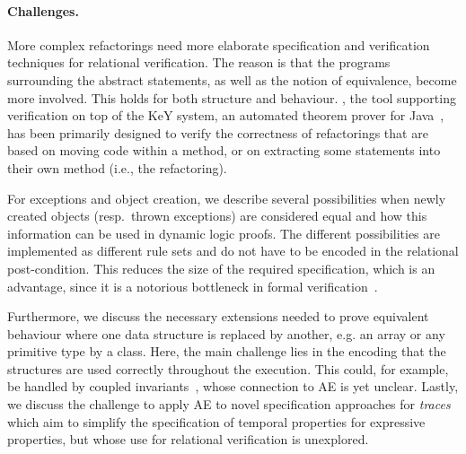 \paragraph{Challenges.}
More complex refactorings need more elaborate specification and verification techniques for relational verification. 
The reason is that the programs surrounding the abstract statements, as well as the notion of equivalence, become more involved.
This holds for both structure and behaviour.
 \Refinity{} \cite{steinhoefel:ae}, the tool supporting verification on top of the KeY system, an automated theorem prover for Java~\cite{DBLP:conf/aplas/Steinhofel20},
has been primarily designed to verify the correctness of refactorings that are based on moving code within a method, or on extracting some statements into their own method (i.e., the  refactoring).



For exceptions and object creation, we describe several possibilities when newly created objects (resp.\ thrown exceptions) are considered equal
and how this information can be used in dynamic logic proofs. The different possibilities are implemented as different rule sets and do not have to be encoded in the relational post-condition.
This reduces the size of the required specification, which is an advantage, since it is a notorious bottleneck in formal verification~\cite{DBLP:journals/corr/abs-1211-6186,DBLP:series/lncs/HahnleH19}.


Furthermore, we discuss the necessary extensions needed to prove equivalent behaviour where one data structure is replaced by another, e.g. an array or any primitive type by a class.
Here, the main challenge lies in the encoding that the structures are used correctly throughout the execution.
This could, for example, be handled by coupled invariants~\cite{DBLP:conf/birthday/BeckertU18}, whose connection to AE is yet unclear. 
Lastly, we discuss the challenge to apply AE to novel specification approaches for \emph{traces} which aim to simplify the specification of temporal properties for expressive properties, but whose use for relational verification is unexplored.

